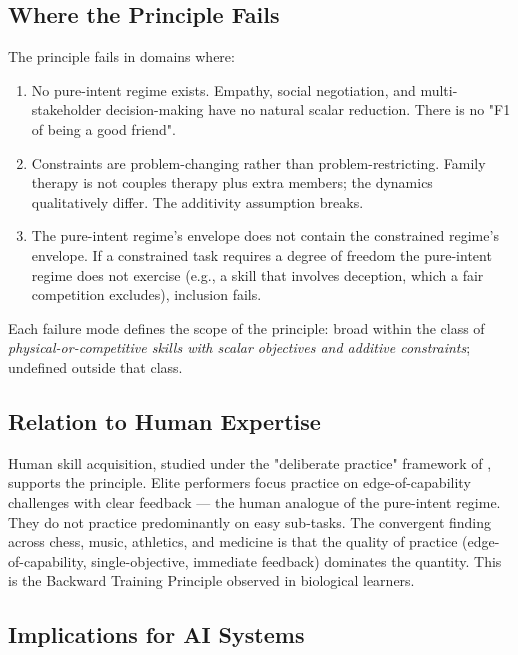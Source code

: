 \documentclass[11pt,twocolumn,a4paper]{article}
\begin{document}
\subsection{Where the Principle Fails}

The principle fails in domains where:

\begin{enumerate}[leftmargin=*,itemsep=1pt]
\item No pure-intent regime exists. Empathy, social negotiation, and multi-stakeholder decision-making have no natural scalar reduction. There is no "F1 of being a good friend".
\item Constraints are problem-changing rather than problem-restricting. Family therapy is not couples therapy plus extra members; the dynamics qualitatively differ. The additivity assumption breaks.
\item The pure-intent regime's envelope does not contain the constrained regime's envelope. If a constrained task requires a degree of freedom the pure-intent regime does not exercise (e.g., a skill that involves deception, which a fair competition excludes), inclusion fails.
\end{enumerate}

Each failure mode defines the scope of the principle: broad within the class of \emph{physical-or-competitive skills with scalar objectives and additive constraints}; undefined outside that class.

\subsection{Relation to Human Expertise}

Human skill acquisition, studied under the "deliberate practice" framework of \citet{ericsson1993deliberate,ericsson2006cambridge,ericsson2007making}, supports the principle. Elite performers focus practice on edge-of-capability challenges with clear feedback --- the human analogue of the pure-intent regime. They do not practice predominantly on easy sub-tasks. The convergent finding across chess, music, athletics, and medicine is that the quality of practice (edge-of-capability, single-objective, immediate feedback) dominates the quantity. This is the Backward Training Principle observed in biological learners.

\subsection{Implications for AI Systems}
\end{document}
